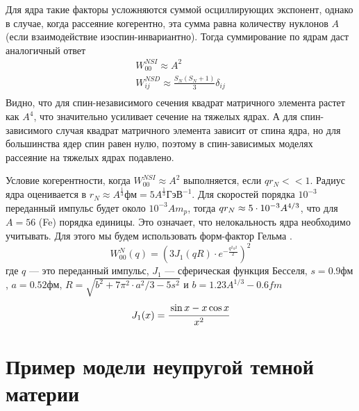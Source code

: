 Для ядра такие факторы усложняются суммой осциллирующих экспонент, однако в случае, когда рассеяние когерентно, эта сумма равна количеству нуклонов $A$ (если взаимодействие изоспин-инвариантно). Тогда суммирование по ядрам даст аналогичный ответ
\begin{equation}
	\begin{split}
		W^{N SI}_{00} \approx A^2 \\ 
		W^{N SD}_{ij} \approx \frac{S_{N}(S_{N}+1)}{3} \delta_{ij} \\
	\end{split}
\end{equation}
Видно, что для спин-независимого сечения квадрат матричного элемента растет как $A^4$, что значительно усиливает сечение на тяжелых ядрах. А для спин-зависимого случая квадрат матричного элемента зависит от спина ядра, но для большинства ядер спин равен нулю, поэтому в спин-зависимых моделях рассеяние на тяжелых ядрах подавлено.

Условие когерентности, когда $W^{N SI}_{00} \approx A^2$ выполняется, если $q r_N << 1$. Радиус ядра оценивается в $r_N \approx A^{\frac{1}{3}} \text{фм} = 5 A^{\frac{1}{3}} \text{ГэВ}^{-1}$. Для скоростей порядка $10^{-3}$ переданный импульс будет около $10^{-3}A m_p$, тогда $qr_N \approx {5}\cdot 10^{-3}A^{4/3}$, что для $A=56$ (Fe) порядка единицы. Это означает, что нелокальность ядра необходимо учитывать. Для этого мы будем использовать форм-фактор Гельма \cite{D_da_2007}.
\begin{equation}
	\label{eq:form_factor}
	W^N_{00}(q) = \left(3J_1(qR)\cdot e^{-\frac{q^2s^2}{2}}\right)^2
\end{equation}
где $q$ --- это переданный импульс, $J_1$ --- сферическая функция Бесселя, $s = 0.9 \text{фм}$, $a = 0.52 \text{фм}$, $R = \sqrt{b^2+7\pi^2\cdot a^2/3-5s^2}$ и $b = 1.23 A^{1/3} - 0.6 fm$
\begin{equation}
	J_1(x) = \cfrac{\sin{x}-x \cos{x}}{x^2} 
\end{equation}


\section{Пример модели неупругой темной материи}

